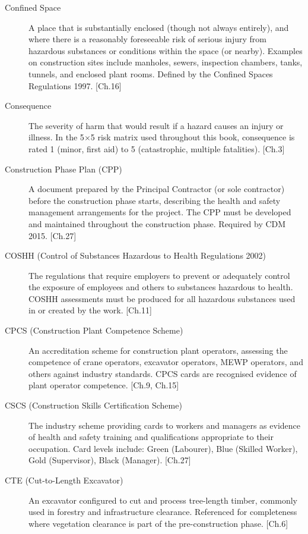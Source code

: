 \begin{description}
\item[Confined Space] A place that is substantially enclosed (though not always entirely), and where there is a reasonably foreseeable risk of serious injury from hazardous substances or conditions within the space (or nearby). Examples on construction sites include manholes, sewers, inspection chambers, tanks, tunnels, and enclosed plant rooms. Defined by the Confined Spaces Regulations 1997. [Ch.16]

\item[Consequence] The severity of harm that would result if a hazard causes an injury or illness. In the 5$\times$5 risk matrix used throughout this book, consequence is rated 1 (minor, first aid) to 5 (catastrophic, multiple fatalities). [Ch.3]

\item[Construction Phase Plan (CPP)] A document prepared by the Principal Contractor (or sole contractor) before the construction phase starts, describing the health and safety management arrangements for the project. The CPP must be developed and maintained throughout the construction phase. Required by CDM 2015. [Ch.27]

\item[COSHH (Control of Substances Hazardous to Health Regulations 2002)] The regulations that require employers to prevent or adequately control the exposure of employees and others to substances hazardous to health. COSHH assessments must be produced for all hazardous substances used in or created by the work. [Ch.11]

\item[CPCS (Construction Plant Competence Scheme)] An accreditation scheme for construction plant operators, assessing the competence of crane operators, excavator operators, MEWP operators, and others against industry standards. CPCS cards are recognised evidence of plant operator competence. [Ch.9, Ch.15]

\item[CSCS (Construction Skills Certification Scheme)] The industry scheme providing cards to workers and managers as evidence of health and safety training and qualifications appropriate to their occupation. Card levels include: Green (Labourer), Blue (Skilled Worker), Gold (Supervisor), Black (Manager). [Ch.27]

\item[CTE (Cut-to-Length Excavator)] An excavator configured to cut and process tree-length timber, commonly used in forestry and infrastructure clearance. Referenced for completeness where vegetation clearance is part of the pre-construction phase. [Ch.6]


\end{description}
